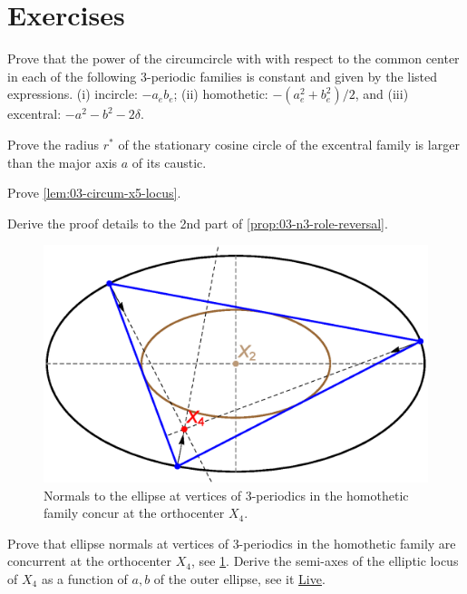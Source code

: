 
\section{Exercises}

\begin{exercise}
 \label{ex:03-power-euler} 
Prove that the power of the circumcircle with with respect to the common center in each of the following 3-periodic families is constant and given by the listed expressions. (i) incircle: $-a_e b_e$; (ii) homothetic: $-({a_e^2+b_e^2})/{2}$, and (iii) excentral: $-a^2-b^2-2\delta$. 
\end{exercise}

\begin{exercise}
\label{ex:03-cosine-circle}
Prove the radius $r^*$ of the stationary cosine circle of the excentral family is larger than the major axis $a$ of its caustic. 
\end{exercise}

\begin{exercise}
Prove \cref{lem:03-circum-x5-locus}.
\label{ex:03-circum-x5-locus}
\end{exercise}

\begin{exercise}
Derive the proof details to the 2nd part of \cref{prop:03-n3-role-reversal}.
\end{exercise}

\begin{figure}
    \centering
    \includegraphics[width=.6\textwidth]{chap_03/pics/pics_03_280_homoth_x4.eps}
    \caption{Normals to the ellipse at vertices of 3-periodics in the homothetic family concur at the orthocenter $X_4$.}
    \label{fig:03-homoth-x4}
\end{figure}

\begin{exercise}
Prove that ellipse normals at vertices of 3-periodics in the homothetic family are concurrent at the orthocenter $X_4$, see \cref{fig:03-homoth-x4}. Derive the semi-axes of the elliptic locus of $X_4$ as a function of $a,b$ of the outer ellipse, see it \href{https://bit.ly/3fpESjh}{Live}.  
\label{ex:03-homoth-x4}
\end{exercise}

